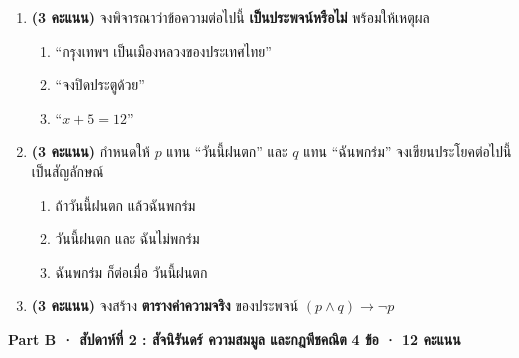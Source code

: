 \documentclass[a4paper,14pt]{article}
\begin{document}
\begin{enumerate}[label=\textbf{A\arabic*.},leftmargin=2.2em,itemsep=8pt]
  \item \textbf{(3 คะแนน)} จงพิจารณาว่าข้อความต่อไปนี้ \textbf{เป็นประพจน์หรือไม่} พร้อมให้เหตุผล
        \begin{enumerate}[label=\arabic*),leftmargin=1.5em,itemsep=1pt,topsep=2pt]
          \item ``กรุงเทพฯ เป็นเมืองหลวงของประเทศไทย''
          \item ``จงปิดประตูด้วย''
          \item ``$x + 5 = 12$''
        \end{enumerate}
        \vspace{1.2em}

  \item \textbf{(3 คะแนน)} กำหนดให้ $p$ แทน ``วันนี้ฝนตก'' และ $q$ แทน ``ฉันพกร่ม''
        จงเขียนประโยคต่อไปนี้เป็นสัญลักษณ์
        \begin{enumerate}[label=\arabic*),leftmargin=1.5em,itemsep=1pt,topsep=2pt]
          \item ถ้าวันนี้ฝนตก แล้วฉันพกร่ม
          \item วันนี้ฝนตก และ ฉันไม่พกร่ม
          \item ฉันพกร่ม ก็ต่อเมื่อ วันนี้ฝนตก
        \end{enumerate}
        \vspace{1.2em}

  \item \textbf{(3 คะแนน)} จงสร้าง \textbf{ตารางค่าความจริง} ของประพจน์ $(p \land q) \rightarrow \neg p$
        \vspace{5em}
\end{enumerate}

\begin{tcolorbox}[colback=mint,colframe=Tgreen,arc=3mm,boxrule=0.5pt,
  left=10pt,right=10pt,top=5pt,bottom=5pt]
\textbf{\textcolor{Tgreen}{Part B · สัปดาห์ที่ 2 : สัจนิรันดร์ ความสมมูล และกฎพีชคณิต}} \hfill \textbf{4 ข้อ · 12 คะแนน}
\end{tcolorbox}
\end{document}
